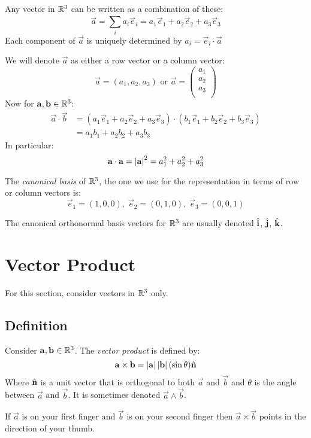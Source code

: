 \documentclass[../main.tex]{subfiles}
\begin{document}
Any vector in $\mathbb{R}^{3}$ can be written as a combination of these:
\[
  \vec{a} = \sum_{i}^{} a_i \vec{e}_i = a_1 \vec{e}_1 + a_2 \vec{e}_2 + a_3 \vec{e}_3
\]
Each component of $\vec{a}$ is uniquely determined by $a_i = \vec{e}_i \cdot \vec{a}$

We will denote $\vec{a}$ as either a row vector or a column vector:
\[
  \vec{a} = (a_1, a_2, a_3) \text{ or } \vec{a} =
  \begin{pmatrix}
  a_1 \\
  a_2 \\
  a_3 \\
  \end{pmatrix}
\]
Now for $\boldsymbol{\mathbf{a}}, \boldsymbol{\mathbf{b}} \in \mathbb{R}^{3}$:
\begin{align*}
  \vec{a} \cdot \vec{b} &= (a_1 \vec{e}_1 + a_2 \vec{e}_2 + a_3 \vec{e}_3) \cdot (b_1 \vec{e}_1 + b_2 \vec{e}_2 + b_3 \vec{e}_3) \\
                        &= a_1 b_1 + a_2 b_2 + a_3 b_3
\end{align*}
In particular:
\[
  \boldsymbol{\mathbf{a}} \cdot \boldsymbol{\mathbf{a}} = \left\lvert \boldsymbol{\mathbf{a}} \right\rvert^2 = a^{2}_{1} + a^{2}_{2} + a^{2}_{3}
\]

The \textit{canonical basis} of $\mathbb{R}^{3}$, the one we use for the representation in terms of row or column vectors is:
\[
  \vec{e}_1 = (1, 0, 0),\; \vec{e}_2 = (0, 1, 0),\; \vec{e}_3 = (0, 0, 1)
\]
\begin{remark}[Notation]
The canonical orthonormal basis vectors for $\mathbb{R}^{3}$ are usually denoted $\hat{\mathbf{i}}$, $\hat{\mathbf{j}}$, $\hat{\mathbf{k}}$.
\end{remark}

\section{Vector Product}
\begin{remark}[Note]
For this section, consider vectors in $\mathbb{R}^{3}$ only.
\end{remark}
\subsection{Definition}
\begin{definition}
  Consider $\boldsymbol{\mathbf{a}}, \boldsymbol{\mathbf{b}} \in \mathbb{R}^{3}$. The \textit{vector product} is defined by:
  \[
    \boldsymbol{\mathbf{a}} \times \boldsymbol{\mathbf{b}} = \left\lvert \boldsymbol{\mathbf{a}} \right\rvert \left\lvert \boldsymbol{\mathbf{b}} \right\rvert(\sin\theta)\hat{\mathbf{n}}
  \]
  Where $\hat{\mathbf{n}}$ is a unit vector that is orthogonal to both $\vec{a}$ and $\vec{b}$ and $\theta$ is the angle between $\vec{a}$ and $\vec{b}$.
  It is sometimes denoted $\vec{a} \wedge \vec{b}$.
\end{definition}
\begin{remark}
  If $\vec{a}$ is on your first finger and $\vec{b}$ is on your second finger then $\vec{a} \times \vec{b}$ points in the direction of your thumb.
\end{remark}
\end{document}
